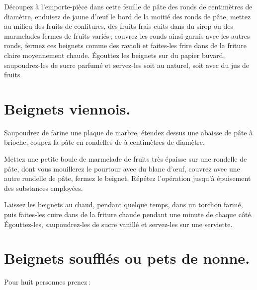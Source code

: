 Découpez à l'emporte-pièce dans cette feuille de pâte des ronds de {\mmm}
centimètres de diamètre, enduisez de jaune d'œuf le bord de la moitié des ronds
de pâte, mettez au milieu des fruits de confitures, des fruits frais cuits dans
du sirop ou des marmelades fermes de fruits variés ; couvrez les ronds ainsi
garnis avec les autres ronds, fermez ces beignets comme des ravioli et
faites-les frire dans de la friture claire moyennement chaude. Égouttez les
beignets sur du papier buvard, saupoudrez-les de sucre parfumé et servez-les
soit au naturel, soit avec du jus de fruits.

\section*{\centering Beignets viennois.}
{}

Saupoudrez de farine une plaque de marbre, étendez dessus une abaisse de pâte
à brioche, coupez la pâte en rondelles de {\mmm} à {\mmm} centimètres
de diamètre.

Mettez une petite boule de marmelade de fruits très épaisse sur une rondelle
de pâte, dont vous mouillerez le pourtour avec du blanc d'œuf, couvrez avec une
autre rondelle de pâte, fermez le beignet. Répétez l'opération jusqu'à épuisement
des substances employées.

Laissez les beignets au chaud, pendant quelque temps, dans un torchon fariné,
puis faites-les cuire dans de la friture chaude pendant une minute de chaque
côté. Égouttez-les, saupoudrez-les de sucre vanillé et servez-les sur une
serviette.

\section*{\centering Beignets soufflés ou pets de nonne.}
{}

Pour huit personnes prenez :

